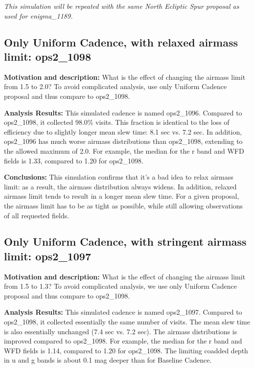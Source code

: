 \documentclass[manuscript]{article}
\begin{document}
{\it This simulation will
be repeated with the same North Ecliptic Spur proposal as used for enigma\_1189.}


\subsection{Only Uniform Cadence, with relaxed airmass limit: ops2\_1098} 


{\bf Motivation and description:}  What is the effect of changing the airmass 
limit from 1.5 to 2.0?  To avoid complicated analysis, use only Uniform Cadence proposal
and thus compare to ops2\_1098.


{\bf Analysis Results:}  This simulated cadence is named ops2\_1096.  Compared
to ops2\_1098, it collected 98.0\% visits. This fraction is identical to the loss of 
efficiency due to slightly longer mean slew time: 8.1 sec vs. 7.2 sec. In addition, 
ops2\_1096 has much worse airmass distributions than ops2\_1098,  extending
to the allowed maximum of 2.0. For example, the median for the r band and WFD fields 
is 1.33, compared to 1.20 for ops2\_1098. 

{\bf Conclusions:} This simulation confirms that it's a bad idea to relax airmass limit:
as a result, the airmass distribution always widens. In addition, relaxed airmass limit
tends to result in a longer mean slew time.  For a given proposal, the airmass limit
has to be as tight as possible, while still allowing observations of all requested fields. 



\subsection{Only Uniform Cadence, with stringent airmass limit: ops2\_1097} 

{\bf Motivation and description:} What is the effect of changing the airmass 
limit from 1.5 to 1.3? To avoid complicated analysis, we use only Uniform Cadence proposal
and thus compare to ops2\_1098.


 {\bf Analysis Results:}  This simulated cadence is named ops2\_1097.  Compared
to ops2\_1098, it collected essentially the same number of visits. The mean slew time
is also essentially unchanged (7.4 sec vs. 7.2 sec). The airmass distributions is improved
compared to ops2\_1098. For example, the median for the r band and WFD fields 
is 1.14, compared to 1.20 for ops2\_1098.  The limiting coadded depth in u and g
bands is about 0.1 mag deeper than for Baseline Cadence. 
\end{document}
